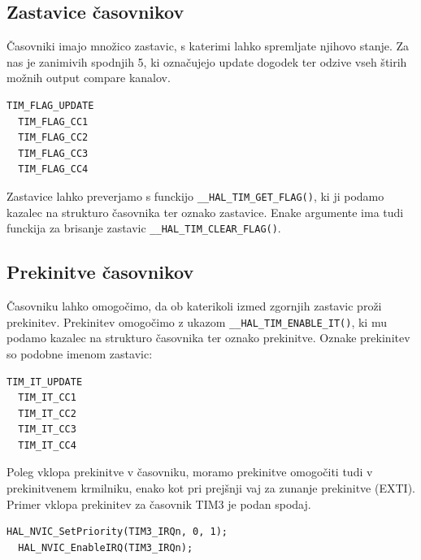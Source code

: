 \documentclass[12pt,letterpaper]{article}
\begin{document}
\subsection*{Zastavice časovnikov}

Časovniki imajo množico zastavic, s katerimi lahko spremljate njihovo stanje. Za nas je zanimivih spodnjih 5, ki označujejo update dogodek ter odzive vseh štirih možnih output compare kanalov.

\begin{center}
\begin{lstlisting}[style=CStyle]
  TIM_FLAG_UPDATE
  TIM_FLAG_CC1
  TIM_FLAG_CC2
  TIM_FLAG_CC3
  TIM_FLAG_CC4
\end{lstlisting}
\end{center}

Zastavice lahko preverjamo s funckijo \texttt{\_\_HAL\_TIM\_GET\_FLAG()}, ki ji podamo kazalec na strukturo časovnika ter oznako zastavice. Enake argumente ima tudi funckija za brisanje zastavic \texttt{\_\_HAL\_TIM\_CLEAR\_FLAG()}.

\subsection*{Prekinitve časovnikov}

Časovniku lahko omogočimo, da ob katerikoli izmed zgornjih zastavic proži prekinitev. Prekinitev omogočimo z ukazom \texttt{\_\_HAL\_TIM\_ENABLE\_IT()}, ki mu podamo kazalec na strukturo časovnika ter oznako prekinitve. Oznake prekinitev so podobne imenom zastavic:

\begin{center}
\begin{lstlisting}[style=CStyle]
  TIM_IT_UPDATE
  TIM_IT_CC1
  TIM_IT_CC2
  TIM_IT_CC3
  TIM_IT_CC4
\end{lstlisting}
\end{center}

Poleg vklopa prekinitve v časovniku, moramo prekinitve omogočiti tudi v prekinitvenem krmilniku, enako kot pri prejšnji vaj za zunanje prekinitve (EXTI). Primer vklopa prekinitev za časovnik TIM3 je podan spodaj.

\begin{center}
\begin{lstlisting}[style=CStyle]
  HAL_NVIC_SetPriority(TIM3_IRQn, 0, 1);
  HAL_NVIC_EnableIRQ(TIM3_IRQn); 
\end{lstlisting}
\end{center}
\end{document}
